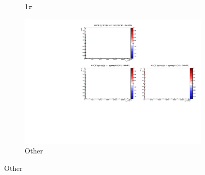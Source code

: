 \begin{figure}[h]
\begin{subfigure}[t]{0.32\textwidth}
		\caption{1$\pi$}
	\end{subfigure}
	\begin{subfigure}[t]{0.32\textwidth}
		\includegraphics[width=\textwidth, trim={5mm 70mm 100mm 7mm}, clip, page=3]{figures/mach3/banff/momentumProjections_170328_withMACH3_MAQEonly}
		\caption{Other}
	\end{subfigure}
	

\end{figure}
